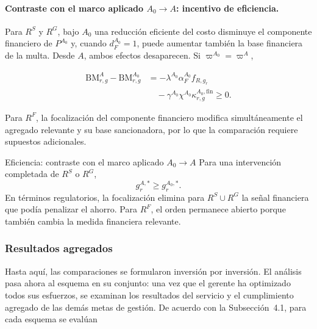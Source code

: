 \paragraph{Contraste con el marco aplicado \(A_0\to A\): incentivo de eficiencia.}

Para \(R^{S}\) y \(R^{G}\), bajo \(A_0\) una reducción eficiente del costo disminuye el componente financiero de \(P^{A_0}\) y, cuando \(d_F^{A_0}=1\), puede aumentar también la base financiera de la multa. Desde \(A\), ambos efectos desaparecen. Si \(\varpi^{A_0}=\varpi^{A}\),

\begin{equation}
\label{eq:diferencia_eficiencia_a_a0}
\begin{aligned}
\mathrm{BM}_{r,g}^{A}
-
\mathrm{BM}_{r,g}^{A_0}
&=
-\lambda^{A_0}
\alpha_F^{A_0}
f_{R,g_r}
\\
&\quad
-
\gamma^{A_0}
\chi^{A_0}
\kappa_{r,g}^{A_0,\mathrm{fin}}
\geq
0.
\end{aligned}
\end{equation}

Para \(R^{F}\), la focalización del componente financiero modifica simultáneamente el agregado relevante y su base sancionadora, por lo que la comparación requiere supuestos adicionales.

\begin{resultadobox}
{Eficiencia: contraste con el marco aplicado \(A_0\to A\)}
\label{res:eficiencia_benchmark_a0_a}
Para una intervención completada de \(R^{S}\) o \(R^{G}\),
\begin{equation}
g_r^{A,*}
\geq
g_r^{A_0,*}.
\end{equation}
En términos regulatorios, la focalización elimina para \(R^{S}\cup R^{G}\) la señal financiera que podía penalizar el ahorro. Para \(R^{F}\), el orden permanece abierto porque también cambia la medida financiera relevante.
\end{resultadobox}

\subsubsection{Resultados agregados}

Hasta aquí, las comparaciones se formularon inversión por inversión. El análisis pasa ahora al esquema en su conjunto: una vez que el gerente ha optimizado todos sus esfuerzos, se examinan los resultados del servicio y el cumplimiento agregado de las demás metas de gestión. De acuerdo con la Subsección~4.1, para cada esquema se evalúan


